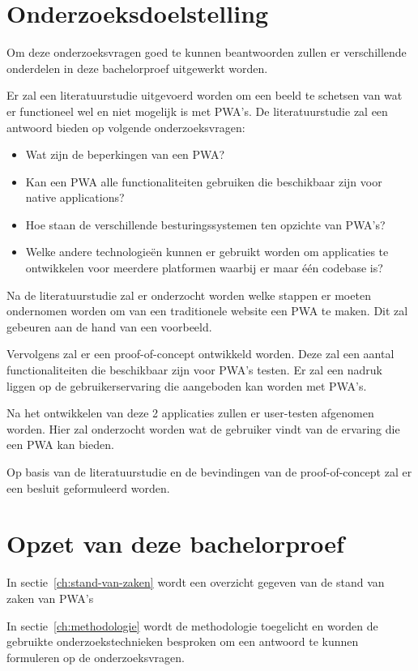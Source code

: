 \section{Onderzoeksdoelstelling}
	
	Om deze onderzoeksvragen goed te kunnen beantwoorden zullen er verschillende onderdelen in deze bachelorproef uitgewerkt worden.
	
	Er zal een literatuurstudie uitgevoerd worden om een beeld te schetsen van wat er functioneel wel en niet mogelijk is met PWA's. 
	De literatuurstudie zal een antwoord bieden op volgende onderzoeksvragen:
	\begin{itemize}
		  \item Wat zijn de beperkingen van een PWA?
		  \item Kan een PWA alle functionaliteiten gebruiken die beschikbaar zijn voor native applications?
		  \item Hoe staan de verschillende besturingssystemen ten opzichte van PWA's?
		  \item Welke andere technologieën kunnen er gebruikt worden om applicaties te ontwikkelen voor meerdere platformen waarbij er maar één codebase is?
	  \end{itemize}	
	  
	Na de literatuurstudie zal er onderzocht worden welke stappen er moeten ondernomen worden om van een traditionele website een PWA te maken. Dit zal gebeuren aan de hand van een voorbeeld.
	
	Vervolgens zal er een proof-of-concept ontwikkeld worden. Deze zal een aantal functionaliteiten die beschikbaar zijn voor PWA's testen. Er zal een nadruk liggen op de gebruikerservaring die aangeboden kan worden met PWA's. 
	
	Na het ontwikkelen van deze 2 applicaties zullen er user-testen afgenomen worden. Hier zal onderzocht worden wat de gebruiker vindt van de ervaring die een PWA kan bieden.
	
	Op basis van de literatuurstudie en de bevindingen van de proof-of-concept zal er een besluit geformuleerd worden.
	
\section{Opzet van deze bachelorproef}

	In sectie~\ref{ch:stand-van-zaken} wordt een overzicht gegeven van de stand van zaken van PWA's
	
	In sectie~\ref{ch:methodologie} wordt de methodologie toegelicht en worden de gebruikte onderzoekstechnieken besproken om een antwoord te kunnen formuleren op de onderzoeksvragen.
	
